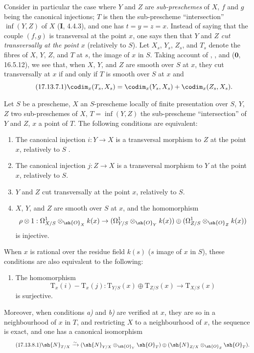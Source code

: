 \begin{env}[17.13.7]
\label{IV.17.13.7}
Consider in particular the case where $Y$ and $Z$ are \emph{sub-preschemes} of $X$, $f$ and $g$ being the canonical injections; $T$ is then the sub-prescheme ``intersection'' $\inf(Y,Z)$ of $X$ (\textbf{I}, 4.4.3), and one has $t=y=z=x$.
Instead of saying that the couple $(f,g)$ is transversal at the point $x$, one says then that $Y$ and $Z$ \emph{cut transversally at the point $x$} (relatively to $S$).
Let $X_s$, $Y_s$, $Z_s$, and $T_s$ denote the fibres of $X$, $Y$, $Z$, and $T$ at $s$, the image of $x$ in $S$.
Taking account of , , and ($\mathbf{0}$, 16.5.12), we see that, when $X$, $Y$, and $Z$ are smooth over $S$ at $x$, they cut transversally at $x$ if and only if $T$ is smooth over $S$ at $x$ and
\[
\label{IV.17.13.7.1}
\tag{17.13.7.1}
\codim_x(T_s,X_s) = \codim_x(Y_s,X_s) + \codim_x(Z_s,X_s).
\]
\end{env}

\begin{proposition}[17.13.8]
\label{IV.17.13.8}
Let $S$ be a prescheme, $X$ an $S$-prescheme locally of finite presentation over $S$, $Y$, $Z$ two sub-preschemes of $X$, $T=\inf(Y,Z)$ the sub-prescheme ``intersection'' of $Y$ and $Z$, $x$ a point of $T$.
The following conditions are equivalent:
\begin{enumerate}
  \item[a)] The canonical injection $i:Y\to X$ is a transversal morphism to $Z$ at the point $x$, relatively to $S$ .
  \item[a${}'$)] The canonical injection $j:Z\to X$ is a transversal morphism to $Y$ at the point $x$, relatively to $S$.
  \item[a${}''$)] $Y$ and $Z$ cut transversally at the point $x$, relatively to $S$.
  \item[b)] $X$, $Y$, and $Z$ are smooth over $S$ at $x$, and the homomorphism
  \[
    \rho\otimes 1: \Omega^1_{X/S}\otimes_{\sh{O}_X}k(x) \to (\Omega^1_{Y/S}\otimes_{\sh{O}_Y}k(x))\oplus(\Omega^1_{Z/S}\otimes_{\sh{O}_Z}k(x))
  \]
  is injective.
\end{enumerate}
When $x$ is rational over the residue field $k(s)$ ($s$ image of $x$ in $S$), these conditions are also equivalent to the following:
\begin{enumerate}
  \item[b${}'$)] The homomorphism
  \[
    \mathrm{T}_x(i)-\mathrm{T}_x(j): \mathrm{T}_{Y/S}(x)\oplus\mathrm{T}_{Z/S}(x) \to \mathrm{T}_{X/S}(x)
  \]
  is surjective.
\end{enumerate}
Moreover, when conditions \emph{a)} and \emph{b)} are verified at $x$, they are so in a neighbourhood of $x$ in $T$, and restricting $X$ to a neighbourhood of $x$, the sequence  is exact, and one has a canonical isomorphism
\[
\label{IV.17.13.8.1}
\tag{17.13.8.1}
\sh{N}_{T/X} \xrightarrow{\sim} (\sh{N}_{Y/X}\otimes_{\sh{O}_Y}\sh{O}_T)\oplus(\sh{N}_{Z/X}\otimes_{\sh{O}_Z}\sh{O}_T).
\]
\end{proposition}

